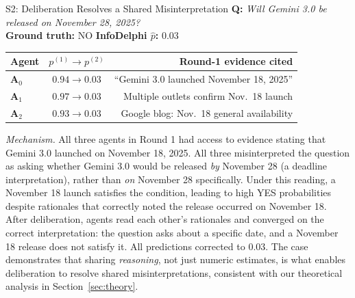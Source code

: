 \documentclass[11pt]{article}
\theoremstyle{plain}
\theoremstyle{definition}
\newcommand{\agA}[1]{\textcolor{agA}{\textbf{#1}}}
\newcommand{\agB}[1]{\textcolor{agB}{\textbf{#1}}}
\newcommand{\agC}[1]{\textcolor{agC}{\textbf{#1}}}
\begin{document}
\begin{successcase}{S2: Deliberation Resolves a Shared Misinterpretation}
\textbf{Q:} \textit{Will Gemini 3.0 be released on November 28, 2025?}\\[2pt]
\textbf{Ground truth:} NO \quad \textbf{InfoDelphi $\hat{p}$:} 0.03

\smallskip
\setlength{\tabcolsep}{4pt}
\renewcommand{\arraystretch}{1.2}
\begin{tabularx}{\linewidth}{@{}l c R@{}}
\toprule
\textbf{Agent} & $p^{(1)}\!\to\!p^{(2)}$ & \textbf{Round-1 evidence cited} \\
\midrule
\agA{A$_0$} & $0.94 \to 0.03$ & ``Gemini 3.0 launched November 18, 2025'' \\
\agB{A$_1$} & $0.97 \to 0.03$ & Multiple outlets confirm Nov.\ 18 launch \\
\agC{A$_2$} & $0.93 \to 0.03$ & Google blog: Nov.\ 18 general availability \\
\bottomrule
\end{tabularx}

\smallskip
\textit{Mechanism.} All three agents in Round 1 had access to evidence stating
that Gemini 3.0 launched on November 18, 2025. All three misinterpreted the
question as asking whether Gemini 3.0 would be released \textit{by}
November 28 (a deadline interpretation), rather than \textit{on} November 28
specifically. Under this reading, a November 18 launch satisfies the
condition, leading to high YES probabilities despite rationales that
correctly noted the release occurred on November 18. After deliberation,
agents read each other's rationales and converged on the correct
interpretation: the question asks about a specific date, and a November 18
release does not satisfy it. All predictions corrected to 0.03. The case
demonstrates that sharing \textit{reasoning}, not just numeric estimates, is
what enables deliberation to resolve shared misinterpretations, consistent
with our theoretical analysis in Section~\ref{sec:theory}.
\end{successcase}
\end{document}
